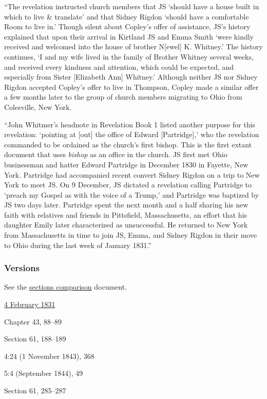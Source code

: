 			``The revelation instructed church members that JS `should have a house built in which to live \& translate' and that Sidney Rigdon `should have a comfortable Room to live in.' Though silent about Copley's offer of assistance, JS's history explained that upon their arrival in Kirtland JS and Emma Smith `were kindly received and welcomed into the house of brother N[ewel] K. Whitney.' The history continues, `I and my wife lived in the family of Brother Whitney several weeks, and received every kindness and attention, which could be expected, and especially from Sister [Elizabeth Ann] Whitney.' Although neither JS nor Sidney Rigdon accepted Copley's offer to live in Thompson, Copley made a similar offer a few months later to the group of church members migrating to Ohio from Colesville, New York.
			
			``John Whitmer's headnote in Revelation Book 1 listed another purpose for this revelation: `pointing at [out] the office of Edward [Partridge],' who the revelation commanded to be ordained as the church's first bishop. This is the first extant document that uses \textit{bishop} as an office in the church. JS first met Ohio businessman and hatter Edward Partridge in December 1830 in Fayette, New York. Partridge had accompanied recent convert Sidney Rigdon on a trip to New York to meet JS. On 9 December, JS dictated a revelation calling Partridge to `preach my Gospel as with the voice of a Trump,' and Partridge was baptized by JS two days later. Partridge spent the next month and a half sharing his new faith with relatives and friends in Pittsfield, Massachusetts, an effort that his daughter Emily later characterized as unsuccessful. He returned to New York from Massachusetts in time to join JS, Emma, and Sidney Rigdon in their move to Ohio during the last week of January 1831.''
			
	\subsubsection{Versions}
		\label{DC41-V}
		
		See the \href{https://drive.google.com/file/d/1goAvNz8jS4R8slYfMG_db55Ty2z_vmgK/view?usp=sharing}{sections comparison} document.
	
		\begin{compactdesc}
			\item[JSP] \hyperref[EMS-1831-JS-4-FEB-1831]{4 February 1831}
			\item[BC] Chapter 43, 88--89
			\item[DC 1835] Section 61, 188--189
			\item[TS] 4:24 (1 November 1843), 368
			\item[MS] 5:4 (September 1844), 49
			\item[DC 1844] Section 61, 285--287
		\end{compactdesc}

